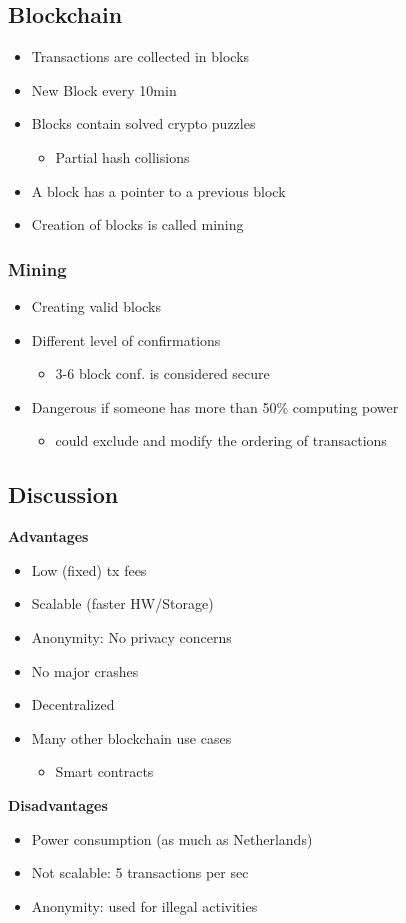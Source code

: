 \subsection{Blockchain}
\begin{itemize}
    \item Transactions are collected in blocks
    \item New Block every 10min
    \item Blocks contain solved crypto puzzles
    \begin{itemize}
        \item Partial hash collisions
    \end{itemize}
    \item A block has a pointer to a previous block
    \item Creation of blocks is called mining
\end{itemize}

\subsubsection{Mining}
\begin{itemize}
    \item Creating valid blocks
    \item Different level of confirmations
    \begin{itemize}
        \item 3-6 block conf. is considered secure
    \end{itemize}
    \item Dangerous if someone has more than 50\% computing power
    \begin{itemize}
        \item could exclude and modify the ordering of transactions
    \end{itemize}
\end{itemize}

\subsection{Discussion}
\textbf{Advantages}
\begin{itemize}
    \item Low (fixed) tx fees
    \item Scalable (faster HW/Storage)
    \item Anonymity: No privacy concerns
    \item No major crashes
    \item Decentralized
    \item Many other blockchain use cases
    \begin{itemize}
        \item Smart contracts
    \end{itemize}
\end{itemize}
\textbf{Disadvantages}
\begin{itemize}
    \item Power consumption (as much as Netherlands)
    \item Not scalable: 5 transactions per sec
    \item Anonymity: used for illegal activities
\end{itemize}

